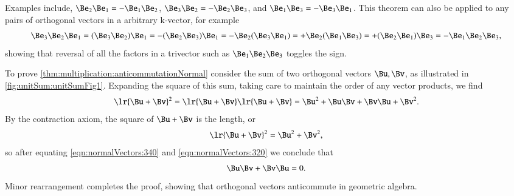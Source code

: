 %
%

Examples include,
\( \Be_2 \Be_1 = -\Be_1 \Be_2 \),
\( \Be_3 \Be_2 = -\Be_2 \Be_3 \), and
\( \Be_1 \Be_3 = -\Be_3 \Be_1 \).  This theorem can also be applied to any pairs of orthogonal vectors in a arbitrary k-vector, for example
\begin{dmath}\label{eqn:normalVectors:300}
\Be_3 \Be_2 \Be_1
= (\Be_3 \Be_2) \Be_1
= -(\Be_2 \Be_3) \Be_1
= -\Be_2 (\Be_3 \Be_1)
= +\Be_2 (\Be_1 \Be_3)
= +(\Be_2 \Be_1) \Be_3
= -\Be_1 \Be_2 \Be_3,
\end{dmath}
showing that reversal of all the factors in a trivector such as \( \Be_1 \Be_2 \Be_3 \) toggles the sign.

To prove \cref{thm:multiplication:anticommutationNormal} consider the
sum of two orthogonal vectors \( \Bu, \Bv \), as illustrated in \cref{fig:unitSum:unitSumFig1}.  Expanding the square
of this sum, taking care to maintain the order of any vector products, we find
\begin{dmath}\label{eqn:normalVectors:340}
\lr{ \Bu + \Bv }^2 =
\lr{ \Bu + \Bv }
\lr{ \Bu + \Bv }
=
\Bu^2 + \Bu \Bv + \Bv \Bu + \Bv^2.
\end{dmath}
By the contraction axiom, the square of \( \Bu + \Bv \) is the length, or
\begin{dmath}\label{eqn:normalVectors:320}
\lr{ \Bu + \Bv }^2 = \Bu^2 + \Bv^2,
\end{dmath}
so after equating
\cref{eqn:normalVectors:340}
and
\cref{eqn:normalVectors:320}
we conclude that
\begin{dmath}\label{eqn:normalVectors:360}
\Bu \Bv + \Bv \Bu = 0.
\end{dmath}
Minor rearrangement completes the proof, showing that orthogonal vectors anticommute in geometric algebra.
